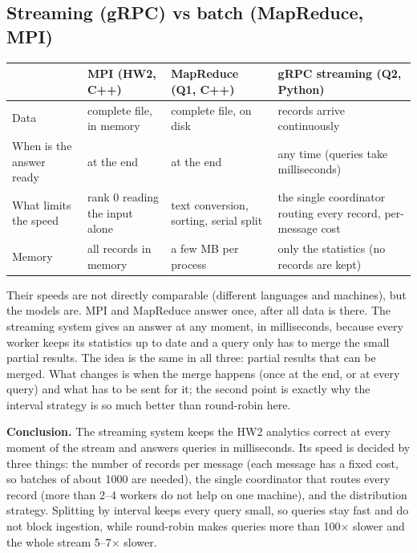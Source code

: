 \documentclass[10pt,a4paper]{article}
\begin{document}
\subsection{Streaming (gRPC) vs batch (MapReduce, MPI)}
\begin{center}\small
\begin{tabularx}{\textwidth}{>{\raggedright\arraybackslash}p{2.8cm}>{\raggedright\arraybackslash}X>{\raggedright\arraybackslash}X>{\raggedright\arraybackslash}X}
\toprule
 & MPI (HW2, C++) & MapReduce (Q1, C++) & gRPC streaming (Q2, Python) \\
\midrule
Data & complete file, in memory & complete file, on disk & records arrive continuously \\
When is the answer ready & at the end & at the end & any time (queries take milliseconds) \\
What limits the speed & rank 0 reading the input alone & text conversion, sorting, serial split & the single coordinator routing every record, per-message cost \\
Memory & all records in memory & a few MB per process & only the statistics (no records are kept) \\
\bottomrule
\end{tabularx}
\end{center}
Their speeds are not directly comparable (different languages and machines), but the models are. MPI and MapReduce answer
once, after all data is there. The streaming system gives an answer at any moment, in milliseconds, because every worker keeps
its statistics up to date and a query only has to merge the small partial results. The idea is the same in all three: partial
results that can be merged. What changes is when the merge happens (once at the end, or at every query) and what has to be
sent for it; the second point is exactly why the interval strategy is so much better than round-robin here.

\textbf{Conclusion.} The streaming system keeps the HW2 analytics correct at every moment of the stream and answers queries
in milliseconds. Its speed is decided by three things: the number of records per message (each message has a fixed cost, so
batches of about 1000 are needed), the single coordinator that routes every record (more than 2--4 workers do not help on
one machine), and the distribution strategy. Splitting by interval keeps every query small, so queries stay fast and do not
block ingestion, while round-robin makes queries more than 100$\times$ slower and the whole stream 5--7$\times$ slower.
\end{document}
